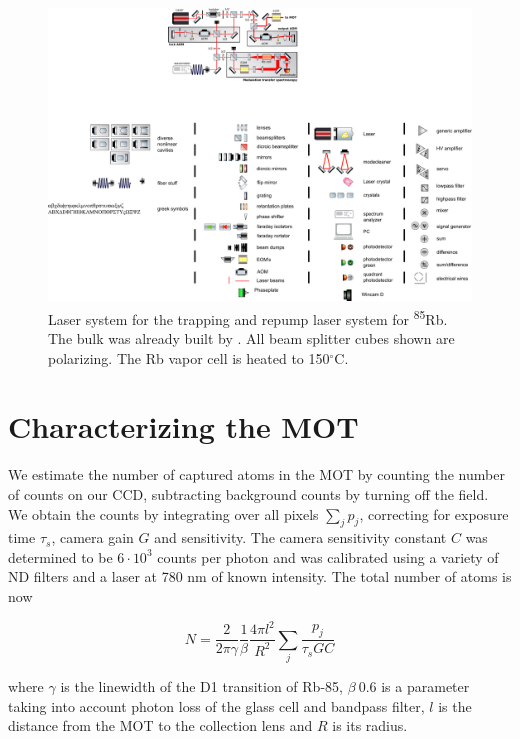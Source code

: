 \begin{figure}
    \centering
    \includegraphics[width=\linewidth]{figures/RbLaserSetup.pdf}
    \caption{Laser system for the trapping and repump laser system for \textsuperscript{85}Rb. The bulk was already built by \cite{Reijnders2010}. All beam splitter cubes shown are polarizing. The Rb vapor cell is heated to 150${^{\circ}}$C.}
    \label{fig:RbLaserSetup}
\end{figure}


\section{Characterizing the MOT}\label{sec:MOTresult}
   
We estimate the number of captured atoms in the MOT by counting the number of counts on our \ac{CCD}, subtracting background counts by turning off the field. 
We obtain the counts by integrating over all pixels $\sum_j p_j$, correcting for exposure time $\tau_s$, camera gain $G$ and sensitivity.
The camera sensitivity constant $C$ was determined to be $6 \cdot 10^3$ counts per photon and was calibrated using a variety of ND filters and a laser at 780 nm of known intensity. The total number of atoms is now
 
 \begin{equation}
     N = \frac{2}{2\pi\gamma} \frac{1}{\beta} \frac{4\pi l^2}{R^2} \sum_j \frac{p_j}{\tau_s G C}
 \end{equation}
 
 where $\gamma$ is the linewidth of the D1 transition of Rb-85, $\beta ~0.6$ is a parameter taking into account photon loss of the glass cell and bandpass filter, $l$ is the distance from the MOT to the collection lens and $R$ is its radius. 
 
